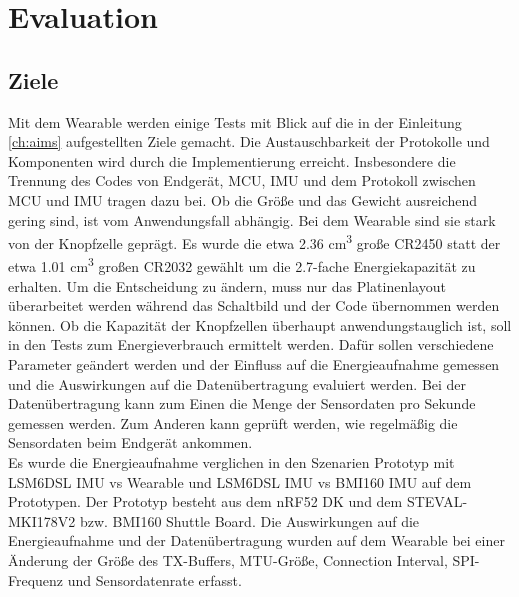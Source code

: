 \chapter{Evaluation}
\label{ch:evaluation}

\section{Ziele}
Mit dem Wearable werden einige Tests mit Blick auf die in der Einleitung \ref{ch:aims} aufgestellten Ziele gemacht.
Die Austauschbarkeit der Protokolle und Komponenten wird durch die Implementierung erreicht.
Insbesondere die Trennung des Codes von Endgerät, MCU, IMU und dem Protokoll zwischen MCU und IMU tragen dazu bei.
Ob die Größe und das Gewicht ausreichend gering sind, ist vom Anwendungsfall abhängig.
Bei dem Wearable sind sie stark von der Knopfzelle geprägt.
Es wurde die etwa 2.36 cm\textsuperscript{3} große CR2450 statt der etwa 1.01 cm\textsuperscript{3} großen CR2032 gewählt um die 2.7-fache Energiekapazität zu erhalten.
Um die Entscheidung zu ändern, muss nur das Platinenlayout überarbeitet werden während das Schaltbild und der Code übernommen werden können.
Ob die Kapazität der Knopfzellen überhaupt anwendungstauglich ist, soll in den Tests zum Energieverbrauch ermittelt werden.
Dafür sollen verschiedene Parameter geändert werden und der Einfluss auf die Energieaufnahme gemessen und die Auswirkungen auf die Datenübertragung evaluiert werden.
Bei der Datenübertragung kann zum Einen die Menge der Sensordaten pro Sekunde gemessen werden.
Zum Anderen kann geprüft werden, wie regelmäßig die Sensordaten beim Endgerät ankommen.\\
Es wurde die Energieaufnahme verglichen in den Szenarien Prototyp mit LSM6DSL IMU vs Wearable und LSM6DSL IMU vs BMI160 IMU auf dem Prototypen.
Der Prototyp besteht aus dem nRF52 DK und dem STEVAL-MKI178V2 bzw. BMI160 Shuttle Board.
Die Auswirkungen auf die Energieaufnahme und der Datenübertragung wurden auf dem Wearable bei einer Änderung der Größe des TX-Buffers, MTU-Größe, Connection Interval, SPI-Frequenz und Sensordatenrate erfasst.

